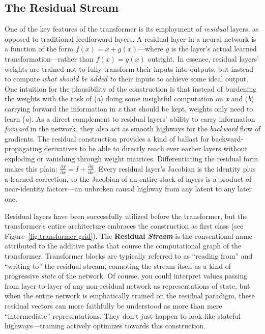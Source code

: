 \documentclass{article}
\begin{document}
\subsection{The Residual Stream}\label{sec:resid}
One of the key features of the transformer is its employment of \textit{residual} layers, as opposed to traditional feedforward layers. A residual layer in a neural network is a function of the form \(f(x) = x + g(x)\)---where \(g\) is the layer's actual learned transformation---rather than \(f(x) = g(x)\) outright. In essence, residual layers' weights are trained not to fully transform their inputs into outputs, but instead to compute \textit{what should be added to} their inputs to achieve some ideal output. One intuition for the plausibility of the construction is that instead of burdening the weights with the task of (\textit{a}) doing some insightful computation on \textit{x} and (\textit{b}) carrying forward the information in \textit{x} that should be kept, weights only need to learn (\textit{a}). As a direct complement to residual layers' ability to carry information \textit{forward} in the network, they also act as smooth highways for the \textit{backward} flow of gradients. The residual construction provides a kind of ballast for backward-propagating derivatives to be able to directly reach ever earlier layers without exploding or vanishing through weight matrices. Differentiating the residual form makes this plain: \(\frac{\partial f}{\partial x} = I + \frac{\partial g}{\partial x}\). Every residual layer's Jacobian is the identity plus a learned correction, so the Jacobian of an entire stack of layers is a product of near-identity factors---an unbroken causal highway from any latent to any later one. 

Residual layers have been successfully utilized before the transformer, but the transformer's entire architecture embraces the construction as first class (see Figure~\ref{fig:transformer-grid}). The \textbf{Residual \textit{Stream}} is the conventional name attributed to the additive paths that course the computational graph of the transformer. Transformer blocks are typically referred to as ``reading from'' and ``writing to'' the residual stream, connoting the stream itself as a kind of progressive \textit{state} of the network. Of course, you could interpret values passing from layer-to-layer of any non-residual network as representations of state, but when the entire network is emphatically trained on the residual paradigm, these residual vectors can more faithfully be understood as more than mere ``intermediate'' representations. They don't just happen to look like stateful highways---training actively optimizes towards this construction.
\end{document}
